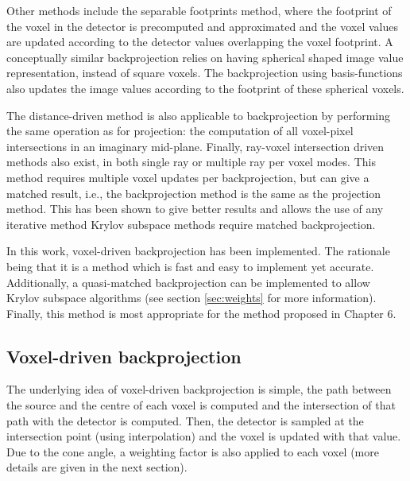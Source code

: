 Other methods include the separable footprints method\cite{long20103d}, where the footprint of the voxel in the detector is precomputed and approximated and the voxel values are updated according to the detector values overlapping the voxel footprint. A conceptually similar backprojection relies on having spherical shaped image value representation, instead of square voxels\cite{spherical}. The backprojection using basis-functions also updates the image values according to the footprint of these spherical voxels.
 
The distance-driven method\cite{schlifske2016fast} is also applicable to backprojection by performing the same operation as for projection: the computation of all voxel-pixel intersections in an imaginary mid-plane. Finally, ray-voxel intersection driven methods also exist\cite{park2015fully}, in both single ray or multiple ray per voxel modes. This method requires multiple voxel updates per backprojection, but can give a matched result, i.e., the backprojection method is the same as the projection method. This has been shown to give better results\cite{6829349} and allows the use of any iterative method Krylov subspace methods require matched backprojection. 
 
In this work, voxel-driven backprojection has been implemented. The rationale being that it is a method which is fast and easy to implement yet accurate. Additionally, a quasi-matched backprojection can be implemented to allow Krylov subspace algorithms (see section \ref{sec:weights} for more information). Finally, this method is most appropriate for the method proposed in Chapter 6.
 

\subsection{Voxel-driven backprojection}

The underlying idea of voxel-driven backprojection is simple, the path between the source and the centre of each voxel is computed and the intersection of that path with the detector is computed. Then, the detector is sampled at the intersection point (using interpolation) and the voxel is updated with that value. Due to the cone angle, a weighting factor is also applied to each voxel (more details are given in the next section).

